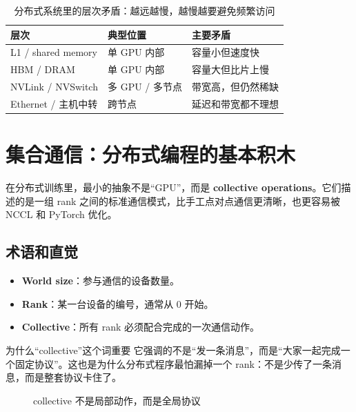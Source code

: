 \documentclass[a4paper]{article}
\begin{document}
\begin{table}[H]
\centering
\begin{tabular}{lll}
\toprule
\textbf{层次} & \textbf{典型位置} & \textbf{主要矛盾} \\
\midrule
L1 / shared memory & 单 GPU 内部 & 容量小但速度快 \\
HBM / DRAM & 单 GPU 内部 & 容量大但比片上慢 \\
NVLink / NVSwitch & 多 GPU / 多节点 & 带宽高，但仍然稀缺 \\
Ethernet / 主机中转 & 跨节点 & 延迟和带宽都不理想 \\
\bottomrule
\end{tabular}
\caption{分布式系统里的层次矛盾：越远越慢，越慢越要避免频繁访问}
\end{table}

\section{集合通信：分布式编程的基本积木}

在分布式训练里，最小的抽象不是“GPU”，而是 \textbf{collective operations}。它们描述的是一组 rank 之间的标准通信模式，比手工点对点通信更清晰，也更容易被 NCCL 和 PyTorch 优化。

\subsection{术语和直觉}

\begin{itemize}
    \item \textbf{World size}：参与通信的设备数量。
    \item \textbf{Rank}：某一台设备的编号，通常从 0 开始。
    \item \textbf{Collective}：所有 rank 必须配合完成的一次通信动作。
\end{itemize}

\begin{knowledgebox}{为什么“collective”这个词重要}
它强调的不是“发一条消息”，而是“大家一起完成一个固定协议”。这也是为什么分布式程序最怕漏掉一个 rank：不是少传了一条消息，而是整套协议卡住了。
\end{knowledgebox}

\begin{figure}[H]
\centering
{}
\caption{collective 不是局部动作，而是全局协议}
\end{figure}
\end{document}
